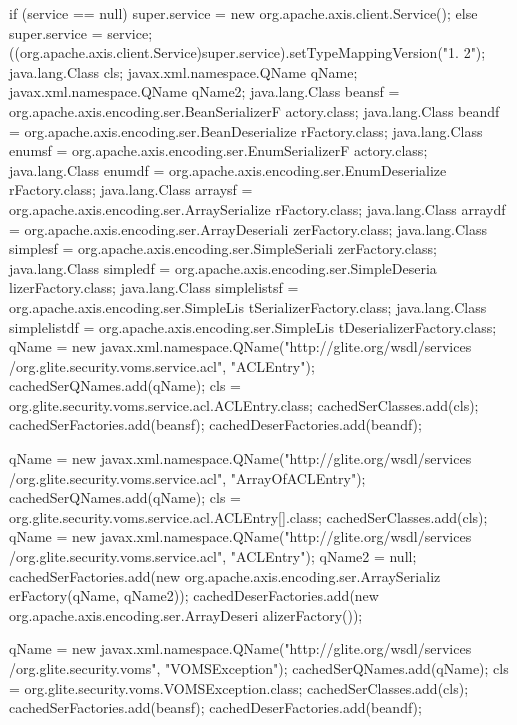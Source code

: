 \begin{DoxyCode}
                                                                                 
                       {
        if (service == null) {
            super.service = new org.apache.axis.client.Service();
        } else {
            super.service = service;
        }
        ((org.apache.axis.client.Service)super.service).setTypeMappingVersion("1.
      2");
            java.lang.Class cls;
            javax.xml.namespace.QName qName;
            javax.xml.namespace.QName qName2;
            java.lang.Class beansf = org.apache.axis.encoding.ser.BeanSerializerF
      actory.class;
            java.lang.Class beandf = org.apache.axis.encoding.ser.BeanDeserialize
      rFactory.class;
            java.lang.Class enumsf = org.apache.axis.encoding.ser.EnumSerializerF
      actory.class;
            java.lang.Class enumdf = org.apache.axis.encoding.ser.EnumDeserialize
      rFactory.class;
            java.lang.Class arraysf = org.apache.axis.encoding.ser.ArraySerialize
      rFactory.class;
            java.lang.Class arraydf = org.apache.axis.encoding.ser.ArrayDeseriali
      zerFactory.class;
            java.lang.Class simplesf = org.apache.axis.encoding.ser.SimpleSeriali
      zerFactory.class;
            java.lang.Class simpledf = org.apache.axis.encoding.ser.SimpleDeseria
      lizerFactory.class;
            java.lang.Class simplelistsf = org.apache.axis.encoding.ser.SimpleLis
      tSerializerFactory.class;
            java.lang.Class simplelistdf = org.apache.axis.encoding.ser.SimpleLis
      tDeserializerFactory.class;
            qName = new javax.xml.namespace.QName("http://glite.org/wsdl/services
      /org.glite.security.voms.service.acl", "ACLEntry");
            cachedSerQNames.add(qName);
            cls = org.glite.security.voms.service.acl.ACLEntry.class;
            cachedSerClasses.add(cls);
            cachedSerFactories.add(beansf);
            cachedDeserFactories.add(beandf);

            qName = new javax.xml.namespace.QName("http://glite.org/wsdl/services
      /org.glite.security.voms.service.acl", "ArrayOfACLEntry");
            cachedSerQNames.add(qName);
            cls = org.glite.security.voms.service.acl.ACLEntry[].class;
            cachedSerClasses.add(cls);
            qName = new javax.xml.namespace.QName("http://glite.org/wsdl/services
      /org.glite.security.voms.service.acl", "ACLEntry");
            qName2 = null;
            cachedSerFactories.add(new org.apache.axis.encoding.ser.ArraySerializ
      erFactory(qName, qName2));
            cachedDeserFactories.add(new org.apache.axis.encoding.ser.ArrayDeseri
      alizerFactory());

            qName = new javax.xml.namespace.QName("http://glite.org/wsdl/services
      /org.glite.security.voms", "VOMSException");
            cachedSerQNames.add(qName);
            cls = org.glite.security.voms.VOMSException.class;
            cachedSerClasses.add(cls);
            cachedSerFactories.add(beansf);
            cachedDeserFactories.add(beandf);

    }
\end{DoxyCode}


